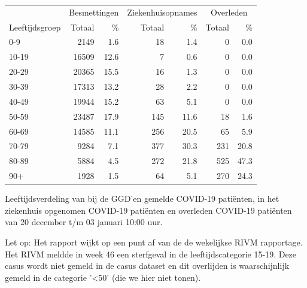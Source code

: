 \documentclass[
  english,
  man,floatsintext]{apa6}
\begin{document}
\begin{table}[H]
\centering\begingroup\fontsize{11}{13}\selectfont

\begin{threeparttable}
\begin{tabular}{lrrrrrr}
\toprule
\multicolumn{1}{c}{ } & \multicolumn{2}{c}{Besmettingen} & \multicolumn{2}{c}{Ziekenhuisopnames} & \multicolumn{2}{c}{Overleden} \\
\cmidrule(l{3pt}r{3pt}){2-3} \cmidrule(l{3pt}r{3pt}){4-5} \cmidrule(l{3pt}r{3pt}){6-7}
Leeftijdsgroep & Totaal & \% & Totaal & \% & Totaal & \%\\
\midrule
0-9 & 2149 & 1.6 & 18 & 1.4 & 0 & 0.0\\
10-19 & 16509 & 12.6 & 7 & 0.6 & 0 & 0.0\\
20-29 & 20365 & 15.5 & 16 & 1.3 & 0 & 0.0\\
30-39 & 17313 & 13.2 & 28 & 2.2 & 0 & 0.0\\
40-49 & 19944 & 15.2 & 63 & 5.1 & 0 & 0.0\\
50-59 & 23487 & 17.9 & 145 & 11.6 & 18 & 1.6\\
60-69 & 14585 & 11.1 & 256 & 20.5 & 65 & 5.9\\
70-79 & 9284 & 7.1 & 377 & 30.3 & 231 & 20.8\\
80-89 & 5884 & 4.5 & 272 & 21.8 & 525 & 47.3\\
90+ & 1928 & 1.5 & 64 & 5.1 & 270 & 24.3\\
\bottomrule
\end{tabular}
\begin{tablenotes}
\item[1] Leeftijdsverdeling van bij de GGD’en gemelde COVID-19 patiënten, in het ziekenhuis opgenomen COVID-19 patiënten en overleden COVID-19 patiënten van 20 december t/m 03 januari 10:00 uur.
\item[2] Let op: Het rapport wijkt op een punt af van de de wekelijkse RIVM rapportage. Het RIVM meldde in week 46 een sterfgeval in de leeftijdscategorie 15-19. Deze casus wordt niet gemeld in de casus dataset en dit overlijden is waarschijnlijk gemeld in de categorie '<50' (die we hier niet tonen).
\end{tablenotes}
\end{threeparttable}
\endgroup{}
\end{table}

\newpage
\end{document}
